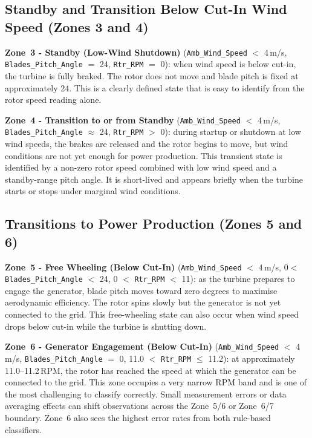 \subsection{Standby and Transition Below Cut-In Wind Speed (Zones 3 and 4)}
\label{subsec:ch3:zones:34}

\textbf{Zone~3 - Standby (Low-Wind Shutdown)}
(\texttt{Amb\_Wind\_Speed} $<$ 4\,m/s, \texttt{Blades\_Pitch\_Angle} $=$ 24\textdegree,
\texttt{Rtr\_RPM} $=$ 0): when wind speed is below cut-in, the turbine is fully braked.
The rotor does not move and blade pitch is fixed at approximately 24\textdegree. This is
a clearly defined state that is easy to identify from the rotor speed reading alone.

\textbf{Zone~4 - Transition to or from Standby}
(\texttt{Amb\_Wind\_Speed} $<$ 4\,m/s, \texttt{Blades\_Pitch\_Angle} $\approx$
24\textdegree, \texttt{Rtr\_RPM} $>$ 0): during startup or shutdown at low wind speeds,
the brakes are released and the rotor begins to move, but wind conditions are not yet
enough for power production. This transient state is identified by a non-zero rotor speed
combined with low wind speed and a standby-range pitch angle. It is short-lived and
appears briefly when the turbine starts or stops under marginal wind conditions.

\subsection{Transitions to Power Production (Zones 5 and 6)}
\label{subsec:ch3:zones:56}

\textbf{Zone~5 - Free Wheeling (Below Cut-In)}
(\texttt{Amb\_Wind\_Speed} $<$ 4\,m/s,
0\textdegree $<$ \texttt{Blades\_Pitch\_Angle} $<$ 24\textdegree,
0 $<$ \texttt{Rtr\_RPM} $<$ 11): as the turbine prepares to engage the generator,
blade pitch moves toward zero degrees to maximise aerodynamic efficiency. The rotor spins
slowly but the generator is not yet connected to the grid. This free-wheeling state can
also occur when wind speed drops below cut-in while the turbine is shutting down.

\textbf{Zone~6 - Generator Engagement (Below Cut-In)}
(\texttt{Amb\_Wind\_Speed} $<$ 4\,m/s,
\texttt{Blades\_Pitch\_Angle} $=$ 0\textdegree,
11.0 $<$ \texttt{Rtr\_RPM} $\leq$ 11.2): at approximately 11.0--11.2\,RPM, the rotor
has reached the speed at which the generator can be connected to the grid. This zone
occupies a very narrow RPM band and is one of the most challenging to classify correctly.
Small measurement errors or data averaging effects can shift observations across the
Zone~5/6 or Zone~6/7 boundary. Zone~6 also sees the highest error rates from both
rule-based classifiers.

